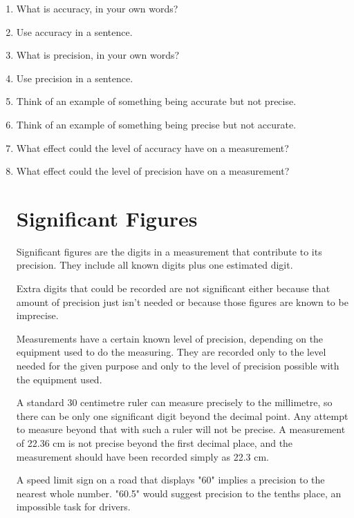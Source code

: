 \documentclass{article}
\begin{document}
\begin{enumerate}
\item What is accuracy, in your own words?
\item Use accuracy in a sentence.
\item What is precision, in your own words?
\item Use precision in a sentence.
\item Think of an example of something being accurate but not precise.
\item Think of an example of something being precise but not accurate.
\item What effect could the level of accuracy have on a measurement?
\item What effect could the level of precision have on a measurement?

\section*{Significant Figures}

Significant figures are the digits in a measurement that contribute to its precision. They include all known digits plus one estimated digit.

Extra digits that could be recorded are not significant either because that amount of precision just isn't needed or because those figures are known to be imprecise.

Measurements have a certain known level of precision, depending on the equipment used to do the measuring. They are recorded only to the level needed for the given purpose and only to the level of precision possible with the equipment used.

A standard 30 centimetre ruler can measure precisely to the millimetre, so there can be only one significant digit beyond the decimal point. Any attempt to measure beyond that with such a ruler will not be precise. A measurement of 22.36 cm is not precise beyond the first decimal place, and the measurement should have been recorded simply as 22.3 cm.

A speed limit sign on a road that displays "60" implies a precision to the nearest whole number. "60.5" would suggest precision to the tenths place, an impossible task for drivers.


\end{enumerate}
\end{document}
